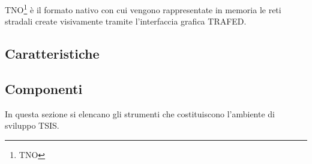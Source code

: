 \begin{definizione}\label{defn:tno-format}
\acs{TNO}\footnote{\acf{TNO}} è il formato nativo con cui vengono rappresentate in memoria le reti stradali create visivamente tramite l'interfaccia grafica \acs{TRAFED}.
\end{definizione}

\subsection{Caratteristiche}

\subsection{Componenti}

In questa sezione si elencano gli strumenti che costituiscono l'ambiente di sviluppo \acs{TSIS}.

